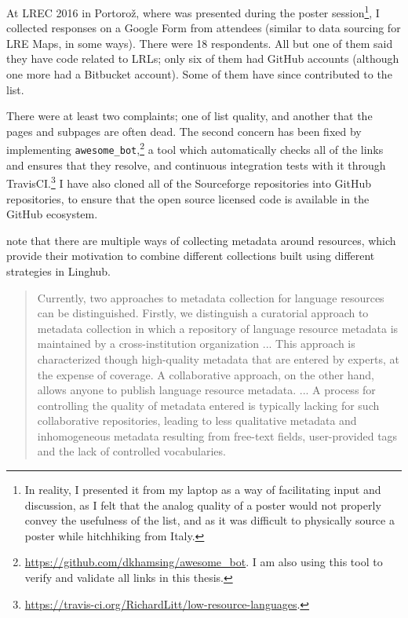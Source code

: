 At LREC 2016 in Portoro\v{z}, where \citet{CCURL} was presented during the poster session\footnote{In reality, I presented it from my laptop as a way of facilitating input and discussion, as I felt that the analog quality of a poster would not properly convey the usefulness of the list, and as it was difficult to physically source a poster while hitchhiking from Italy.}, I collected responses on a Google Form from attendees (similar to data sourcing for LRE Maps, in some ways). There were 18 respondents. All but one of them said they have code related to LRLs; only six of them had GitHub accounts (although one more had a Bitbucket account). Some of them have since contributed to the list.

There were at least two complaints; one of list quality, and another that the pages and subpages are often dead. The second concern has been fixed by implementing {\tt awesome\_bot},\footnote{\href{https://github.com/dkhamsing/awesome_bot}{https://github.com/dkhamsing/awesome\_bot}.  I am also using this tool to verify and validate all links in this thesis.} a tool which automatically checks all of the links and ensures that they resolve, and continuous integration tests with it through TravisCI.\footnote{\href{https://travis-ci.org/RichardLitt/low-resource-languages}{https://travis-ci.org/RichardLitt/low-resource-languages}. } I have also cloned all of the Sourceforge repositories into GitHub repositories, to ensure that the open source licensed code is available in the GitHub ecosystem.

\citet[88]{mccrae2015linghub} note that there are multiple ways of collecting metadata around resources, which provide their motivation to combine different collections built using different strategies in Linghub.

\begin{quote}
Currently, two approaches to metadata collection for language resources can be distinguished. Firstly, we distinguish a curatorial approach to metadata collection in which a repository of language resource metadata is maintained by a cross-institution organization ... This approach is characterized though high-quality metadata that are entered by experts, at the expense of coverage. A collaborative approach, on the other hand, allows anyone to publish language resource metadata. ... A process for controlling the quality of metadata entered is typically lacking for such collaborative repositories, leading to less qualitative metadata and inhomogeneous metadata resulting from free-text fields, user-provided tags and the lack of controlled vocabularies.
\end{quote}

